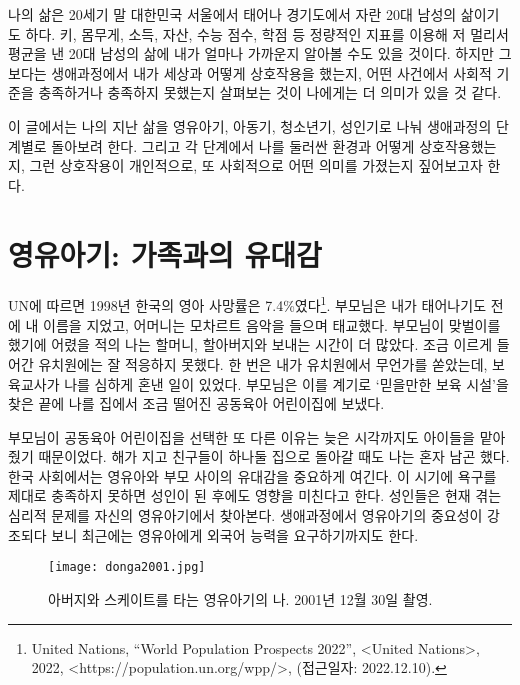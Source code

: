 \maketitle

나의 삶은 20세기 말 대한민국 서울에서 태어나 경기도에서 자란 20대 남성의 삶이기도 하다. 키, 몸무게, 소득, 자산, 수능 점수, 학점 등 정량적인 지표를 이용해 저 멀리서 평균을 낸 20대 남성의 삶에 내가 얼마나 가까운지 알아볼 수도 있을 것이다. 하지만 그보다는 생애과정에서 내가 세상과 어떻게 상호작용을 했는지, 어떤 사건에서 사회적 기준을 충족하거나 충족하지 못했는지 살펴보는 것이 나에게는 더 의미가 있을 것 같다.

이 글에서는 나의 지난 삶을 영유아기, 아동기, 청소년기, 성인기로 나눠 생애과정의 단계별로 돌아보려 한다. 그리고 각 단계에서 나를 둘러싼 환경과 어떻게 상호작용했는지, 그런 상호작용이 개인적으로, 또 사회적으로 어떤 의미를 가졌는지 짚어보고자 한다.

\section*{영유아기: 가족과의 유대감}

UN에 따르면 1998년 한국의 영아 사망률은 7.4\%였다\footnote{United Nations, ``World Population Prospects 2022'', <United Nations>, 2022, <https://population.un.org/wpp/>, (접근일자: 2022.12.10).}. 부모님은 내가 태어나기도 전에 내 이름을 지었고, 어머니는 모차르트 음악을 들으며 태교했다. 부모님이 맞벌이를 했기에 어렸을 적의 나는 할머니, 할아버지와 보내는 시간이 더 많았다. 조금 이르게 들어간 유치원에는 잘 적응하지 못했다. 한 번은 내가 유치원에서 무언가를 쏟았는데, 보육교사가 나를 심하게 혼낸 일이 있었다. 부모님은 이를 계기로 `믿을만한 보육 시설'을 찾은 끝에 나를 집에서 조금 떨어진 공동육아 어린이집에 보냈다.

부모님이 공동육아 어린이집을 선택한 또 다른 이유는 늦은 시각까지도 아이들을 맡아줬기 때문이었다. 해가 지고 친구들이 하나둘 집으로 돌아갈 때도 나는 혼자 남곤 했다. 한국 사회에서는 영유아와 부모 사이의 유대감을 중요하게 여긴다. 이 시기에 욕구를 제대로 충족하지 못하면 성인이 된 후에도 영향을 미친다고 한다. 성인들은 현재 겪는 심리적 문제를 자신의 영유아기에서 찾아본다. 생애과정에서 영유아기의 중요성이 강조되다 보니 최근에는 영유아에게 외국어 능력을 요구하기까지도 한다.

\begin{figure}[h]
  \centering
  \texttt{[image: donga2001.jpg]}
  \caption[]{아버지와 스케이트를 타는 영유아기의 나. 2001년 12월 30일 촬영\footnotemark.}
\end{figure}

